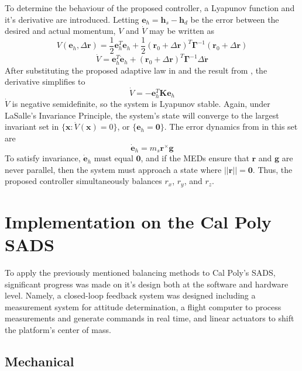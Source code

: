 To determine the behaviour of the proposed controller, a Lyapunov function and it's derivative are introduced. Letting $\bm{e}_h=\bm{h}_s-\bm{h}_d$ be the error between the desired and actual momentum, $V$ and $\dot{V}$ may be written as
\begin{equation}
    V(\bm{e}_h,\Delta\bm{r})=\frac{1}{2}\bm{e}_h^T\bm{e}_h
    +\frac{1}{2}(\bm{r}_0+\Delta\bm{r})^T\bm{\Gamma}^{-1}(\bm{r}_0+\Delta\bm{r})
\end{equation}
\begin{equation}
    \dot{V}=\bm{e}_h^T\dot{\bm{e}}_h
    +(\bm{r}_0+\Delta\bm{r})^T\bm{\Gamma}^{-1}\Delta\dot{\bm{r}}
\end{equation}
After substituting the proposed adaptive law in  and the result from , the derivative simplifies to 
\begin{equation}
    \dot{V}=-\bm{e}_h^T\bm{K}\bm{e}_h
\end{equation}
$\dot{V}$ is negative semidefinite, so the system is Lyapunov stable. Again, under LaSalle's Invariance Principle, the system's state will converge to the largest invariant set in $\{\bm{x}:\dot V(\bm{x})=0 \}$, or $\{\bm{e}_h=\bm{0}\}$. The error dynamics from  in this set are
\begin{equation}
    \dot{\bm{e}}_h=m_s\bm{r}^{\times}\bm{g}
\end{equation}
To satisfy invariance, $\dot{\bm{e}}_h$ must equal $\bm{0}$, and if the MEDs ensure that $\bm{r}$ and ${\bm{g}}$ are never parallel, then the system must approach a state where $||\bm{r}||=\bm{0}$. Thus, the proposed controller simultaneously balances $r_x$, $r_y$, and $r_z$.

\section{Implementation on the Cal Poly SADS}

To apply the previously mentioned balancing methods to Cal Poly's SADS, significant progress was made on it's design both at the software and hardware level. Namely, a closed-loop feedback system was designed including a measurement system for attitude determination, a flight computer to process measurements and generate commands in real time, and linear actuators to shift the platform's center of mass.

\subsection{Mechanical}

